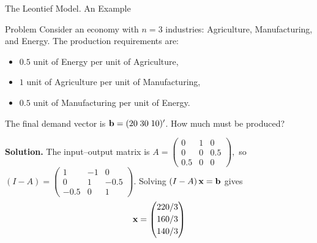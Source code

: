 \documentclass[9pt]{beamer}
\begin{document}
\begin{frame}{The Leontief Model. An Example}

    \begin{block}{Problem}    
        Consider an economy with $n = 3$ industries: Agriculture, Manufacturing, and Energy. The production requirements are:
        \begin{itemize}
            \item[$\bullet$] $0.5$ unit of Energy per unit of Agriculture,
            \item[$\bullet$] $1$ unit of Agriculture per unit of Manufacturing,
            \item[$\bullet$] $0.5$ unit of Manufacturing per unit of Energy.
        \end{itemize}
        The final demand vector is ${\bf b}=(20\;30\;10)'$. How much must be produced?
    \end{block}

    \small
    \textbf{Solution.}
    The input–output matrix is
    \(
    A=\begin{pmatrix}
    0 & 1 & 0\\
    0 & 0 & 0.5\\
    0.5 & 0 & 0
    \end{pmatrix},
    \)
    so
    \(
    (I-A)=\begin{pmatrix}
    1 & -1 & 0\\
    0 & 1 & -0.5\\
    -0.5 & 0 & 1
    \end{pmatrix}.
    \)
    Solving $(I-A)\,{\bf x}={\bf b}$ gives
    \[
    {\bf x}=\begin{pmatrix}220/3\\[2pt] 160/3\\[2pt]140/3\end{pmatrix}
    \]
\end{frame}
\end{document}
